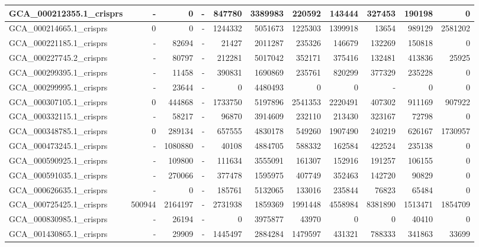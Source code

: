 \documentclass[12pt,a4paper]{article}
\begin{document}
\begin{table}[ht]
\begin{center}
\begin{tabular}{|l*{10}{|r}|}
GCA\_000212355.1\_crisprs & - & 0 & - & 847780 & 3389983 & 220592 & 143444 & 327453 & 190198 & 0 \\ \hline
GCA\_000214665.1\_crisprs & 0 & 0 & - & 1244332 & 5051673 & 1225303 & 1399918 & 13654 & 989129 & 2581202 \\ \hline
GCA\_000221185.1\_crisprs & - & 82694 & - & 21427 & 2011287 & 235326 & 146679 & 132269 & 150818 & 0 \\ \hline
GCA\_000227745.2\_crisprs & - & 80797 & - & 212281 & 5017042 & 352171 & 375416 & 132481 & 413836 & 25925 \\ \hline
GCA\_000299395.1\_crisprs & - & 11458 & - & 390831 & 1690869 & 235761 & 820299 & 377329 & 235228 & 0 \\ \hline
GCA\_000299995.1\_crisprs & - & 23644 & - & 0 & 4480493 & 0 & 0 & - & 0 & 0 \\ \hline
GCA\_000307105.1\_crisprs & 0 & 444868 & - & 1733750 & 5197896 & 2541353 & 2220491 & 407302 & 911169 & 907922 \\ \hline
GCA\_000332115.1\_crisprs & - & 58217 & - & 96870 & 3914609 & 232110 & 213430 & 323167 & 72798 & 0 \\ \hline
GCA\_000348785.1\_crisprs & 0 & 289134 & - & 657555 & 4830178 & 549260 & 1907490 & 240219 & 626167 & 1730957 \\ \hline
GCA\_000473245.1\_crisprs & - & 1080880 & - & 40108 & 4884705 & 588332 & 162584 & 422524 & 235138 & 0 \\ \hline
GCA\_000590925.1\_crisprs & - & 109800 & - & 111634 & 3555091 & 161307 & 152916 & 191257 & 106155 & 0 \\ \hline
GCA\_000591035.1\_crisprs & - & 270066 & - & 377478 & 1595975 & 407749 & 352463 & 142720 & 90829 & 0 \\ \hline
GCA\_000626635.1\_crisprs & - & 0 & - & 185761 & 5132065 & 133016 & 235844 & 76823 & 65484 & 0 \\ \hline
GCA\_000725425.1\_crisprs & 500944 & 2164197 & - & 2731938 & 1859369 & 1991448 & 4558984 & 8381890 & 1513471 & 1854709 \\ \hline
GCA\_000830985.1\_crisprs & - & 26194 & - & 0 & 3975877 & 43970 & 0 & 0 & 40410 & 0 \\ \hline
GCA\_001430865.1\_crisprs & - & 29909 & - & 1445497 & 2884284 & 1479597 & 431321 & 788333 & 341863 & 33699 \\ \hline
\end{tabular}
\end{center}
\end{table}
\end{document}

